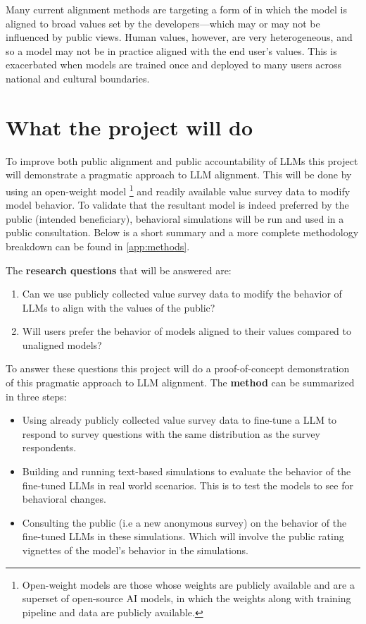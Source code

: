 \documentclass[11pt, a4paper]{article}
\begin{document}
Many current alignment methods \cite{baiConstitutionalAIHarmlessness2022,CollectiveConstitutionalAI2023} are targeting a form of  in which the model is aligned to broad values set by the developers—which may or may not be influenced by public views. Human values, however, are very heterogeneous, and so a model  may not be in practice aligned with the end user's values. This is exacerbated when models are trained once and deployed to many users across national and cultural boundaries.

\section{What the project will do}

To improve both public alignment and public accountability of LLMs this project will demonstrate a pragmatic approach to LLM alignment. This will be done by using an open-weight model \footnote{Open-weight models are those whose weights are publicly available and are a superset of open-source AI models, in which the weights along with training pipeline and data are publicly available.} and readily available value survey data to modify model behavior. To validate that the resultant model is indeed preferred by the public (intended beneficiary), behavioral simulations will be run and used in a public consultation. Below is a short summary and a more complete methodology breakdown can be found in \ref{app:methods}.

The \textbf{research questions} that will be answered are:
\begin{enumerate}
	\item Can we use publicly collected value survey data to modify the behavior of LLMs to align with the values of the public?
	\item Will users prefer the behavior of models aligned to their values compared to unaligned models?
\end{enumerate}

To answer these questions this project will do a proof-of-concept demonstration of this pragmatic approach to LLM alignment. The \textbf{method} can be summarized in three steps:
\begin{itemize}
	\item Using already publicly collected value survey data to fine-tune a LLM to respond to survey questions with the same distribution as the survey respondents.
	\item Building and running text-based simulations to evaluate the behavior of the fine-tuned LLMs in real world scenarios. This is to test the models to see for behavioral changes.
	\item Consulting the public (i.e a new anonymous survey) on the behavior of the fine-tuned LLMs in these simulations. Which will involve the public rating vignettes of the model's behavior in the simulations.
\end{itemize}
\end{document}
